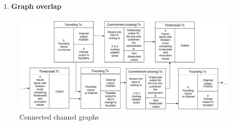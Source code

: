 \begin{enumerate}
    \item \textbf{Graph overlap}\\
    
\end{enumerate}

\begin{figure}[h]
    \centering
    \includegraphics[width=14cm]{figures/graph_linking.png}
    \caption{Connected channel graphs}
    \label{fig:linking_graphs}
\end{figure}


















